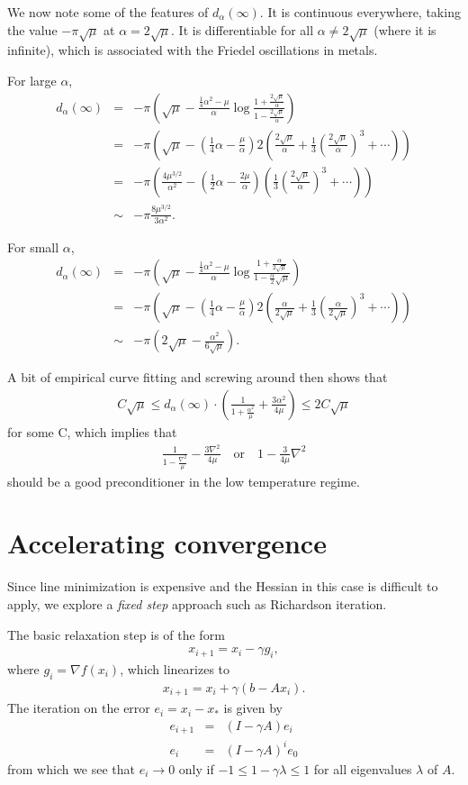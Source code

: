 \documentclass{article}
\newcommand{\beas}{\begin{eqnarray*}}
\newcommand{\enas}{\end{eqnarray*}}
\begin{document}
We now note some of the features of $d_\alpha(\infty)$.  It is continuous
everywhere, taking the value $-\pi\sqrt{\mu}$ at $\alpha = 2\sqrt{\mu}$.
It is differentiable for all $\alpha \ne 2\sqrt{\mu}$
(where it is infinite),
which is associated with the Friedel oscillations in metals.

For large $\alpha$,
\beas
d_\alpha(\infty)
 &=&
-\pi
\left(\sqrt{\mu} - \frac{\frac{1}{4} \alpha^2-\mu}{\alpha}
\log\frac{1+\frac{2\sqrt{\mu}}{\alpha}}{1-\frac{2\sqrt{\mu}}{\alpha}}\right)
\\
 &=&
-\pi
\left(\sqrt{\mu} - \left(\frac{1}{4} \alpha-\frac{\mu}{\alpha}\right)
2 \left(\frac{2\sqrt{\mu}}{\alpha} + \frac{1}{3}\left(\frac{2\sqrt{\mu}}{\alpha}\right)^3 + \cdots\right)\right)
\\
&=&
-\pi
\left(\frac{4 \mu^{3/2}}{\alpha^2}
-\left(\frac{1}{2} \alpha-\frac{2\mu}{\alpha}\right)
\left(\frac{1}{3}\left(\frac{2\sqrt{\mu}}{\alpha}\right)^3 + \cdots\right)
\right)
\\
&\sim&
-\pi
\frac{8 \mu^{3/2}}{3 \alpha^2}.
\enas

For small $\alpha$,
\beas
d_\alpha(\infty)
 &=&
-\pi
\left(\sqrt{\mu} - \frac{\frac{1}{4} \alpha^2-\mu}{\alpha}
\log\frac{1+\frac{\alpha}{2\sqrt{\mu}}}{1-\frac{\alpha}2\sqrt{\mu}}\right)
\\
&=&
-\pi
\left(\sqrt{\mu} - \left(\frac{1}{4} \alpha-\frac{\mu}{\alpha}\right)
2 \left(\frac{\alpha}{2\sqrt{\mu}} + \frac{1}{3}\left(\frac{\alpha}{2\sqrt{\mu}}\right)^3 + \cdots\right)\right)
\\
&\sim&
-\pi
\left(2\sqrt{\mu}
-\frac{\alpha^2}{6\sqrt{\mu}}
\right).
\enas

A bit of empirical curve fitting and screwing around then shows that
\beas
C \sqrt{\mu} \le
d_{\alpha}(\infty) \cdot
\left(
\frac{1}{1+\frac{\alpha^2}{\mu}}
+\frac{3\alpha^2}{4 \mu}\right) \le 2 C \sqrt{\mu}
\enas
for some C, which implies that
\beas
\frac{1}{1-\frac{\nabla^2}{\mu}}
-\frac{3\nabla^2}{4 \mu}
\quad\mbox{or}\quad
1 - \frac{3}{4\mu} \nabla^2
\enas
should be a good preconditioner in the low temperature regime.


\section{Accelerating convergence}

Since line minimization is expensive and the Hessian in this
case is difficult to apply, we explore a {\em fixed step}
approach such as Richardson iteration.

The basic relaxation step is of the form
\beas
  x_{i+1} = x_i - \gamma g_i,
\enas
where $g_i = \nabla f(x_i)$, which linearizes to
\beas
  x_{i+1} = x_i + \gamma (b - A x_i).
\enas
The iteration on the error $e_i = x_i - x_*$ is given by
\beas
  e_{i+1} &=& (I - \gamma A) e_i\\
  e_{i} &=& (I - \gamma A)^i e_0
\enas
from which we see that $e_i \rightarrow 0$ only if
$-1 \le 1 - \gamma \lambda \le 1$ for all eigenvalues $\lambda$ of $A$.
\end{document}
